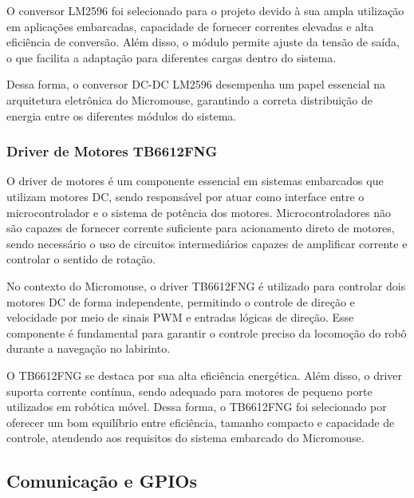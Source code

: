 O conversor LM2596 foi selecionado para o projeto devido à sua ampla utilização em aplicações embarcadas, capacidade de fornecer correntes elevadas e alta eficiência de conversão. Além disso, o módulo permite ajuste da tensão de saída, o que facilita a adaptação para diferentes cargas dentro do sistema.

Dessa forma, o conversor DC-DC LM2596 desempenha um papel essencial na arquitetura eletrônica do Micromouse, garantindo a correta distribuição de energia entre os diferentes módulos do sistema.



\subsubsection{Driver de Motores TB6612FNG}

O driver de motores é um componente essencial em sistemas embarcados que utilizam motores DC, sendo responsável por atuar como interface entre o microcontrolador e o sistema de potência dos motores. Microcontroladores não são capazes de fornecer corrente suficiente para acionamento direto de motores, sendo necessário o uso de circuitos intermediários capazes de amplificar corrente e controlar o sentido de rotação.

No contexto do Micromouse, o driver TB6612FNG é utilizado para controlar dois motores DC de forma independente, permitindo o controle de direção e velocidade por meio de sinais PWM e entradas lógicas de direção. Esse componente é fundamental para garantir o controle preciso da locomoção do robô durante a navegação no labirinto.

O TB6612FNG se destaca por sua alta eficiência energética. Além disso, o driver suporta corrente contínua, sendo adequado para motores de pequeno porte utilizados em robótica móvel. Dessa forma, o TB6612FNG foi selecionado por oferecer um bom equilíbrio entre eficiência, tamanho compacto e capacidade de controle, atendendo aos requisitos do sistema embarcado do Micromouse.


\subsection{Comunicação e GPIOs}


